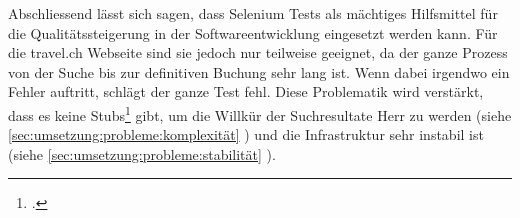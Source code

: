 Abschliessend lässt sich sagen, dass Selenium Tests als mächtiges Hilfsmittel für die Qualitätssteigerung in der Softwareentwicklung eingesetzt werden kann. Für die travel.ch Webseite sind sie jedoch nur teilweise geeignet, da der ganze Prozess von der Suche bis zur definitiven Buchung sehr lang ist. Wenn dabei irgendwo ein Fehler auftritt, schlägt der ganze Test fehl. Diese Problematik wird verstärkt, dass es keine Stubs\footcite{Stubs} gibt, um die Willkür der Suchresultate Herr zu werden (siehe \cref{sec:umsetzung:probleme:komplexität} ) und die Infrastruktur sehr instabil ist (siehe \cref{sec:umsetzung:probleme:stabilität} ).